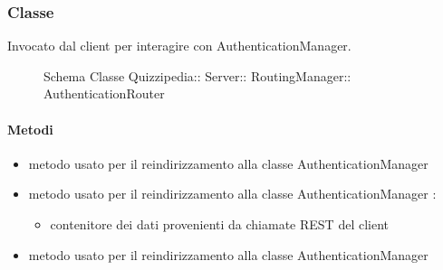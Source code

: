 \subsubsection{Classe }
Invocato dal client per interagire con AuthenticationManager.
\begin{figure}[H]
\centering
\noindent{}
\caption[Schema Classe AuthenticationRouter]{Schema Classe Quizzipedia:: Server:: RoutingManager:: AuthenticationRouter}
\end{figure}
\paragraph{Metodi}
\begin{itemize}
\item {}
\newline
metodo usato per il reindirizzamento alla classe AuthenticationManager
\newline
\item {}
\newline
metodo usato per il reindirizzamento alla classe AuthenticationManager
\newline
{} :
\begin{itemize}
\item {}
\newline
contenitore dei dati provenienti da chiamate REST del client
\end{itemize}
\item {}
\newline
metodo usato per il reindirizzamento alla classe AuthenticationManager
\newline
\end{itemize}
